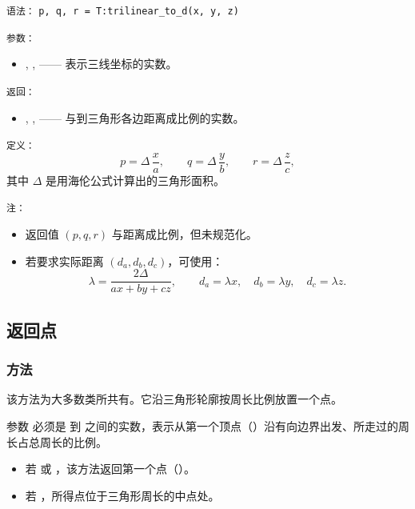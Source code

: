 \medskip
\texttt{语法：}
\verb|p, q, r = T:trilinear_to_d(x, y, z)|

\medskip
\texttt{参数：}
\begin{itemize}
  \item {}, ,  —— 表示三线坐标的实数。
\end{itemize}

\texttt{返回：}
\begin{itemize}
  \item {}, ,  —— 与到三角形各边距离成比例的实数。
\end{itemize}

\texttt{定义：}
\[
p = \Delta\,\frac{x}{a}, \qquad
q = \Delta\,\frac{y}{b}, \qquad
r = \Delta\,\frac{z}{c},
\]
其中 \(\Delta\) 是用海伦公式计算出的三角形面积。

\medskip
\texttt{注：}
\begin{itemize}
  \item 返回值 \((p,q,r)\) 与距离成比例，但未规范化。
  \item 若要求实际距离 \((d_a,d_b,d_c)\)，可使用：
  \[
    \lambda = \frac{2\Delta}{ax + by + cz}, \qquad
    d_a = \lambda x,\quad d_b = \lambda y,\quad d_c = \lambda z.
  \]
\end{itemize}




\subsection{返回点}

\subsubsection{方法 }
\label{ssub:method_triangle_point_r}

该方法为大多数类所共有。它沿三角形轮廓按周长比例放置一个点。

\medskip

参数  必须是  到  之间的实数，表示从第一个顶点（）沿有向边界出发、所走过的周长占总周长的比例。

\begin{itemize}
  \item 若  或 ，该方法返回第一个点（）。
  \item 若 ，所得点位于三角形周长的中点处。
\end{itemize}

